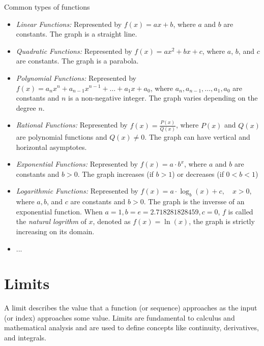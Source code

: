 \begin{mybox}{Common types of functions}

\begin{itemize}
	\item \emph{Linear Functions:} Represented by $f(x)=ax+b$, where $a$ and $b$ are constants. The graph is a straight line.
	\item \emph{Quadratic Functions:} Represented by $f(x)=ax^{2}+bx+c$, where $a$, $b$, and $c$ are constants. The graph is a parabola.
	\item \emph{Polynomial Functions:} Represented by $f(x) = a_{n }x^{n }+a_{n-1 }x^{n-1 }+\ldots+a_{1 }x + a_{0}$, where $a_{n }, a_{n-1 }, \ldots, a_{1 }, a_{0 }$ are constants and $n$ is a non-negative integer. The graph varies depending on the degree $n$.
	\item \emph{Rational Functions:} Represented by $f(x) = \frac{P(x)}{Q(x)}$, where $P(x)$ and $Q(x)$ are polynomial functions and $Q(x)\neq0$. The graph can have vertical and horizontal asymptotes.
	\item \emph{Exponential Functions:} Represented by $f(x) = a \cdot b^{x}$, where $a $ and $b $ are constants and $b>0$. The graph increases (if $b>1$) or decreases (if $0<b<1$)
	\item \emph{Logarithmic Functions:} Represented by $f(x) = a \cdot \log_{b}(x) + c, \quad x>0$, where $a, b$, and $c$ are constants and $b > 0$. The graph is the inversse of an exponential function. When $a=1, b=e=2.718281828459, c=0$, $f$ is called the \emph{natural logrithm} of $x$, denoted as $ f(x) = \ln(x)$, the graph is strictly increasing on its domain.
	\item ...
\end{itemize}

\end{mybox}

\section{Limits}

A limit describes the value that a function (or sequence) approaches as the input (or index) approaches some value. Limits are fundamental to calculus and mathematical analysis and are used to define concepts like continuity, derivatives, and integrals.


